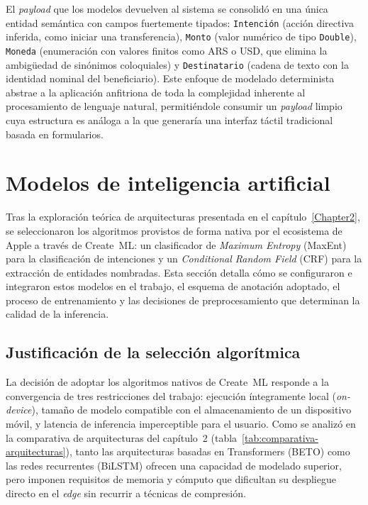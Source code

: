 El \textit{payload} que los modelos devuelven al sistema se consolidó en una única entidad semántica con campos fuertemente tipados: \texttt{Intención} (acción directiva inferida, como iniciar una transferencia), \texttt{Monto} (valor numérico de tipo \texttt{Double}), \texttt{Moneda} (enumeración con valores finitos como ARS o USD, que elimina la ambigüedad de sinónimos coloquiales) y \texttt{Destinatario} (cadena de texto con la identidad nominal del beneficiario). Este enfoque de modelado determinista abstrae a la aplicación anfitriona de toda la complejidad inherente al procesamiento de lenguaje natural, permitiéndole consumir un \textit{payload} limpio cuya estructura es análoga a la que generaría una interfaz táctil tradicional basada en formularios.

\section{Modelos de inteligencia artificial}
\label{sec:modelos-ia}

Tras la exploración teórica de arquitecturas presentada en el capítulo~\ref{Chapter2}, se seleccionaron los algoritmos provistos de forma nativa por el ecosistema de Apple a través de Create~ML: un clasificador de \textit{Maximum Entropy} (MaxEnt) para la clasificación de intenciones y un \textit{Conditional Random Field} (CRF) para la extracción de entidades nombradas. Esta sección detalla cómo se configuraron e integraron estos modelos en el trabajo, el esquema de anotación adoptado, el proceso de entrenamiento y las decisiones de preprocesamiento que determinan la calidad de la inferencia.

\subsection{Justificación de la selección algorítmica}

La decisión de adoptar los algoritmos nativos de Create~ML responde a la convergencia de tres restricciones del trabajo: ejecución íntegramente local (\textit{on-device}), tamaño de modelo compatible con el almacenamiento de un dispositivo móvil, y latencia de inferencia imperceptible para el usuario. Como se analizó en la comparativa de arquitecturas del capítulo~2 (tabla~\ref{tab:comparativa-arquitecturas}), tanto las arquitecturas basadas en Transformers (BETO) como las redes recurrentes (BiLSTM) ofrecen una capacidad de modelado superior, pero imponen requisitos de memoria y cómputo que dificultan su despliegue directo en el \textit{edge} sin recurrir a técnicas de compresión.

